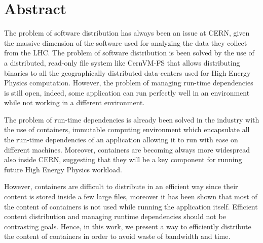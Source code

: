 \begingroup
\let\clearpage\relax
\let\cleardoublepage\relax
\let\cleardoublepage\relax

\chapter*{Abstract}
The problem of software distribution has always been an issue at CERN, given
the massive dimension of the software used for analyzing the data they collect
from the LHC. The problem of software distribution is been solved by the use of
a distributed, read-only file system like CernVM-FS that allows distributing
binaries to all the geographically distributed data-centers used for High
Energy Physics computation. However, the problem of managing run-time
dependencies is still open, indeed, some application can run perfectly well in
an environment while not working in a different environment.

The problem of run-time dependencies is already been solved in the industry
with the use of containers, immutable computing environment which encapsulate
all the run-time dependencies of an application allowing it to run with ease on
different machines. Moreover, containers are becoming always more widespread
also inside CERN, suggesting that they will be a key component for running
future High Energy Physics workload.

However, containers are difficult to distribute in an efficient way since their
content is stored inside a few large files, moreover it has been shown that
most of the content of containers is not used while running the application
itself. Efficient content distribution and managing runtime dependencies should
not be contrasting goals. Hence, in this work, we present a way to efficiently
distribute the content of containers in order to avoid waste of bandwidth and
time.

\newpage

